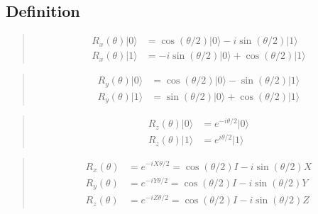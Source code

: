 \documentclass[letterpaper,10pt,english]{jupyterBook}
\begin{document}
\subsection{Definition}
\label{\detokenize{q1gates/r:definition}}
\sphinxAtStartPar
{}
\begin{quote}
\begin{align}
R_x(\theta)|0\rangle &= \cos(\theta/2)|0\rangle - i \sin(\theta/2) |1\rangle\\
R_x(\theta)|1\rangle &= -i \sin(\theta/2) |0\rangle + \cos(\theta/2) |1\rangle
\end{align}
\end{quote}
\begin{quote}
\begin{align}
R_y(\theta)|0\rangle &= \cos(\theta/2)|0\rangle - \sin(\theta/2) |1\rangle\\
R_y(\theta)|1\rangle &= \sin(\theta/2) |0\rangle + \cos(\theta/2) |1\rangle
\end{align}
\end{quote}
\begin{quote}
\begin{align}
R_z(\theta)|0\rangle &= e^{-i \theta/2} |0\rangle\\
R_z(\theta)|1\rangle &= e^{i \theta/2} |1\rangle
\end{align}
\end{quote}

\sphinxAtStartPar
{}
\begin{quote}
\begin{align}
R_x(\theta) &= e^{-i X \theta/2} = \cos(\theta/2) I - i \sin(\theta/2) X\\
R_y(\theta) &= e^{-i Y \theta/2} = \cos(\theta/2) I - i \sin(\theta/2) Y\\
R_z(\theta) &= e^{-i Z \theta/2} = \cos(\theta/2) I - i \sin(\theta/2) Z
\end{align}
\end{quote}
\end{document}
